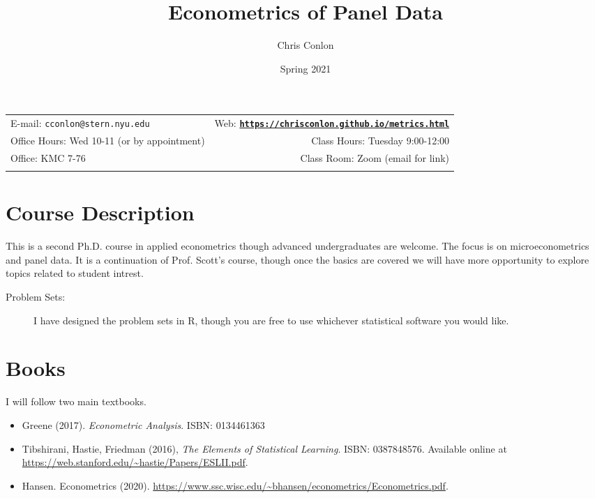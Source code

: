 \documentclass[11pt]{article}
\title{Econometrics of Panel Data}\author{Chris Conlon}
\date{Spring 2021}
\newcommand{\blankline}{\quad\pagebreak[2]}
\begin{document}
\maketitle

\blankline

\begin{tabular*}{.93\textwidth}{@{\extracolsep{\fill}}lr}


  E-mail: \texttt{cconlon@stern.nyu.edu} & Web: \href{http://chrisconlon.org}{\tt\bf https://chrisconlon.github.io/metrics.html}  \\

 Office Hours: Wed 10-11 (or by appointment) &  Class Hours: Tuesday 9:00-12:00 \\


 Office: KMC 7-76  & Class Room: Zoom (email for link) \\
&  \\
\hline
\end{tabular*}

\vspace{10 mm}

\section*{Course Description}
This is a second Ph.D. course in applied econometrics though advanced undergraduates are welcome. The focus is on microeconometrics and panel data. It is a continuation of Prof. Scott's course, though once the basics are covered we will have more opportunity to explore topics related to student intrest.

\begin{description}
\item[Problem Sets:] I have designed the problem sets in R, though you are free to use whichever statistical software you would like. 
\end{description}

\section*{Books}
I will follow two main textbooks.
\begin{itemize}
\item Greene (2017). \textit{Econometric Analysis}. ISBN: 0134461363
\item Tibshirani, Hastie, Friedman (2016), \textit{The Elements of Statistical Learning}. ISBN: 0387848576. Available online at \url{https://web.stanford.edu/~hastie/Papers/ESLII.pdf}.
\item Hansen. Econometrics (2020). \url{https://www.ssc.wisc.edu/~bhansen/econometrics/Econometrics.pdf}.
\end{itemize} 
\end{document}
